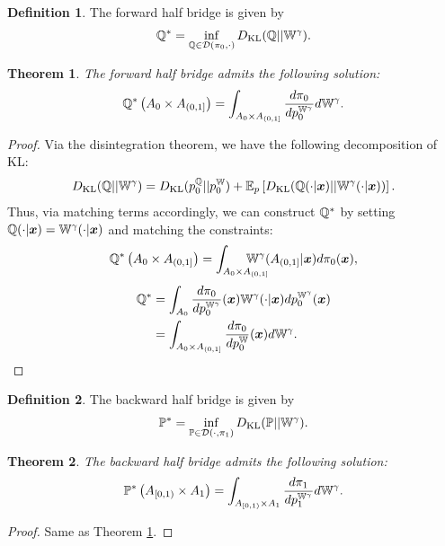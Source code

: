 \documentclass[a4paper,12pt,twoside,openright]{report}
\newtheorem{theorem}{Theorem}
\theoremstyle{definition}
\newtheorem{definition}{Definition}[section]
\begin{document}
\begin{definition}
The forward half bridge is given by
    \begin{align}
        {{\mathbb{Q}}}^{*} = \inf_{{\mathbb{Q}}  \in {\mathcal{D}}(\pi_0, \cdot)} D_{\mathrm{KL}} ({\mathbb{Q}} || \mathbb{W}^\gamma) .
    \end{align}
\end{definition}
\begin{theorem}\label{thrm:half_bridge_forward}
    The forward half bridge admits the following solution: 
\begin{align}
    {{\mathbb{Q}}}^{*}\left(A_0 \times A_{(0,1]}\right) =  \int_{A_0\times A_{(0,1]}} \frac{d \pi_0}{ dp_0^{\mathbb{W}^\gamma}} d\mathbb{W}^\gamma.
\end{align}
\end{theorem}
\begin{proof}
Via the disintegration theorem, we have the following decomposition of KL:
\begin{align}
    D_{\mathrm{KL}}({\mathbb{Q}} || \mathbb{W}^\gamma) = D_{\mathrm{KL}}(p_0^{\mathbb{Q}}|| p_0^{\mathbb{W}} )  + \mathbb{E}_p\left[D_{\mathrm{KL}}({\mathbb{Q}}(\cdot| {\bm{x}}) || \mathbb{W}^\gamma(\cdot | {\bm{x}}))\right]. \nonumber
\end{align}
Thus, via matching terms accordingly, we can construct ${\mathbb{Q}}^*$ by setting ${\mathbb{Q}}(\cdot| {\bm{x}})=\mathbb{W}^{\gamma}(\cdot| {\bm{x}})$ and matching the constraints:
\begin{align}
    {\Q}^{*}\left(A_0 \times A_{(0,1]}\right) = \int_{A_0 \times A_{(0,1]}}\!\!\!\!\!\!\!\!\!\!\!\!\W^\gamma(A_{(0,1]} | \vx) d\pi_0(\vx),
\end{align}
\begin{align}
    {{\mathbb{Q}}}^{*} &= \int_{A_0}  \frac{d\pi_0}{dp_0^{\mathbb{W}^\gamma}}({\bm{x}})   \mathbb{W}^\gamma(\cdot | {\bm{x}}) d p_0^{\mathbb{W}^{\gamma}}({\bm{x}}) \nonumber \\
    &= \int_{A_0 \times A_{(0,1]} }  \frac{d\pi_0}{dp_0^{\mathbb{W}}}({\bm{x}})  d \mathbb{W}^{\gamma}.
\end{align}
\end{proof}
\begin{definition}
The backward half bridge is given by
    \begin{align}
        {{\mathbb{P}}}^{*} = \inf_{{\mathbb{P}}  \in {\mathcal{D}}(\cdot, \pi_1)} D_{\mathrm{KL}} ({\mathbb{P}} || \mathbb{W}^\gamma) .
    \end{align}
\end{definition}
\begin{theorem}\label{thrm:half_bridge_backward}
     The backward half bridge admits the following solution: 
\begin{align}
    {{\mathbb{P}}}^{*}\left( A_{[0,1)} \times A_1\right) =  \int_{ A_{[0,1)} \times A_1}  \frac{d \pi_1}{ d p_1^{\mathbb{W}^\gamma} } d\mathbb{W}^\gamma.
\end{align}

\end{theorem}
\begin{proof}
Same as Theorem \ref{thrm:half_bridge_forward}.
\end{proof}
\end{document}
